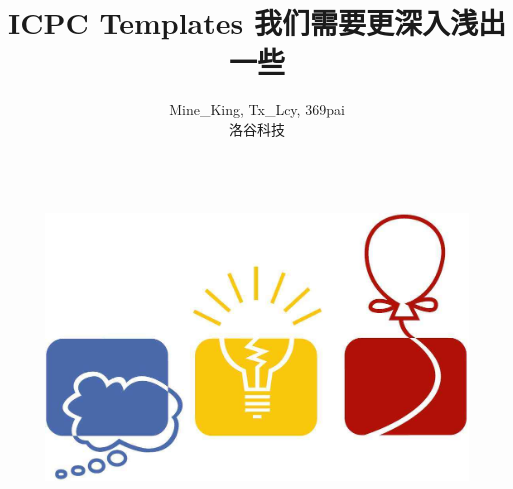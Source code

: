 \documentclass[12pt]{report}
\title{\Huge \textbf{ICPC Templates} \linebreak \linebreak \large \textcolor{primary-blue}{\textbf{我们需要更深入浅出一些}}}
\author{Mine\_King, Tx\_Lcy, 369pai \\ \small 洛谷科技}
\begin{document}
\setlength{\headheight}{5mm}
\setlength{\headsep}{5mm}

\begin{titlepage}
    \begin{figure}
        \centering
        \includegraphics[height=8cm]{images/logo.jpg}
    \end{figure}
    
    \maketitle
\end{titlepage}


\tableofcontents       %
\thispagestyle{empty}  %

\newpage
\setcounter{page}{1}   %



%

%

%

%

%

\end{document}
